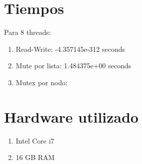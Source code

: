 \documentclass[11pt]{article}
\begin{document}
    \section{Tiempos}
    Para 8 threads:
    \begin{enumerate}
        \item Read-Write: -4.357145e-312 seconds
        \item Mute por lista: 1.484375e+00 seconds
        \item Mutex por nodo:
    \end{enumerate}

    \section{Hardware utilizado}
    \begin{enumerate}
        \item Intel Core i7
        \item 16 GB RAM
    \end{enumerate}
\end{document}
